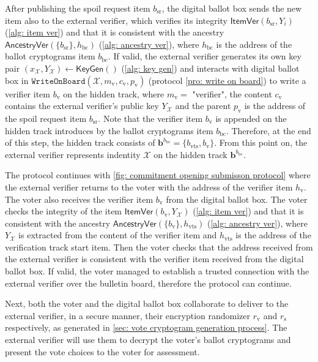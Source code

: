 After publishing the spoil request item $b_\mathrm{sr}$, the digital ballot box sends the new item also to the external verifier, which verifies its integrity $\mathsf{ItemVer}(b_\mathrm{sr}, Y_i)$ (\cref{alg: item ver}) and that it is consistent with the ancestry $\mathsf{AncestryVer}(\{ b_\mathrm{sr} \}, h_\mathrm{bc})$ (\cref{alg: ancestry ver}), where $h_\mathrm{bc}$ is the address of the ballot cryptograms item $b_\mathrm{bc}$. If valid, the external verifier generates its own key pair $(x_\mathcal{X}, Y_\mathcal{X}) \gets \mathsf{KeyGen}()$ (\cref{alg: key gen}) and interacts with digital ballot box in $\mathtt{WriteOnBoard}(\mathcal{X}, m_\mathrm{v}, c_\mathrm{v}, p_\mathrm{v})$ (protocol \ref{pro: write on board}) to write a verifier item $b_\mathrm{v}$ on the hidden track, where $m_\mathrm{v} =$ "verifier", the content $c_\mathrm{v}$ contains the external verifier's public key $Y_\mathcal{X}$ and the parent $p_\mathrm{v}$ is the address of the spoil request item $b_\mathrm{sr}$. Note that the verifier item $b_\mathrm{v}$ is appended on the hidden track introduces by the ballot cryptograms item $b_\mathrm{bc}$. Therefore, at the end of this step, the hidden track consists of $\boldsymbol{b}^{b_\mathrm{bc}} = \{ b_\mathrm{vts}, b_\mathrm{v} \}$. From this point on, the external verifier represents indentity $\mathcal{X}$ on the hidden track $\boldsymbol{b}^{b_\mathrm{bc}}$.

The protocol continues with \cref{fig: commitment opening submisson protocol} where the external verifier returns to the voter with the address of the verifier item $h_\mathrm{v}$. The voter also receives the verifier item $b_\mathrm{v}$ from the digital ballot box. The voter checks the integrity of the item $\mathsf{ItemVer}(b_\mathrm{v}, Y_\mathcal{X})$ (\cref{alg: item ver}) and that it is consistent with the ancestry $\mathsf{AncestryVer}(\{ b_\mathrm{v} \}, h_\mathrm{vts})$ (\cref{alg: ancestry ver}), where $Y_\mathcal{X}$ is extracted from the content of the verifier item and $h_\mathrm{vts}$ is the address of the verification track start item. Then the voter checks that the address received from the external verifier is consistent with the verifier item received from the digital ballot box. If valid, the voter managed to establish a trusted connection with the external verifier over the bulletin board, therefore the protocol can continue.

Next, both the voter and the digital ballot box collaborate to deliver to the external verifier, in a secure manner, their encryption randomizer $r_\mathrm{v}$ and $r_\mathrm{s}$ respectively, as generated in \cref{sec: vote cryptogram generation process}. The external verifier will use them to decrypt the voter's ballot cryptograms and present the vote choices to the voter for assessment.


